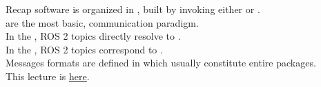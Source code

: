 
\begin{frame}{Recap}
	 software is organized in , built by  invoking either  or .\\
	\bigskip
	 are the most basic,  communication paradigm.\\
	In the , ROS 2 topics directly resolve to .\\
  In the , ROS 2 topics correspond to .\\
	\bigskip
	Messages formats are defined in  which usually constitute entire packages.\\
	\bigskip
	This lecture is \href{https://github.com/robmasocco/DAFN25_Robotics_3}{\color{blue}\underline{here}}.
\end{frame}
